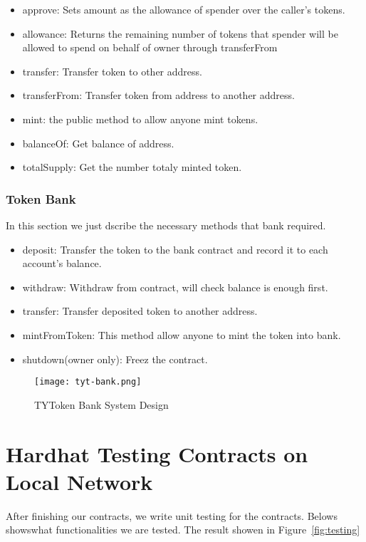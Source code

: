 \begin{itemize}
  \item approve: Sets amount as the allowance of spender over the caller’s tokens.
  \item allowance: Returns the remaining number of tokens that spender will be
        allowed to spend on behalf of owner through transferFrom
  \item transfer: Transfer token to other address.
  \item transferFrom: Transfer token from address to another address.
  \item mint: the public method to allow anyone mint tokens.
  \item balanceOf: Get balance of address.
  \item totalSupply: Get the number totaly minted token.
\end{itemize}

\subsubsection{Token Bank}

In this section we just dscribe the necessary methods that bank required.

\begin{itemize}
  \item deposit: Transfer the token to the bank contract and record it to each
  account's balance.
  \item withdraw: Withdraw from contract, will check balance is enough first.
  \item transfer: Transfer deposited token to another address.
  \item mintFromToken: This method allow anyone to mint the token into bank.
  \item shutdown(owner only): Freez the contract.
\end{itemize}

\begin{figure}[H]
    \centering
    \texttt{[image: tyt-bank.png]}
    \caption{TYToken Bank System Design}
    \label{fig:clayout}
\end{figure}

\section{Hardhat Testing Contracts on Local Network}
\label{sec:hardhat-testing}

After finishing our contracts, we write unit testing for the contracts. Belows
showswhat functionalities we are tested. The result showen in
Figure~\ref{fig:testing}

